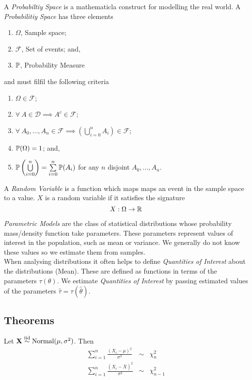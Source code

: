 \documentclass[11pt,a4paper]{article}
\begin{document}
A \textit{Probabiltiy Space} is a mathematicla construct for modelling the real world. A \textit{Probabilitiy Space} has three elements
\begin{enumerate}
	\item $\Omega$, Sample space;
	\item $\mathcal{F}$, Set of events; and,
	\item $\mathbb{P}$, Probability Measure
\end{enumerate}
and must filfil the following criteria
\begin{enumerate}
	\item $\Omega\in\mathcal{F}$;
	\item $\forall\ A\in\mathcal{D}\implies A^c\in\mathcal{F}$;
	\item $\forall\ A_0,\dots,A_n\in\mathcal{F}\implies\left(\bigcup\limits_{i=0}^nA_i\right)\in\mathcal{F}$;
	\item $\mathbb{P}(\Omega)=1$; and,
	\item $\mathbb{P}\left(\bigcup\limits_{i=0}^n\right)=\sum\limits_{i=0}^n\mathbb{P}(A_i)$ for any $n$ disjoint $A_0,\dots,A_n$.
\end{enumerate}

A \textit{Random Variable} is a function which maps maps an event in the sample space to a value. $X$ is a random variable if it satisfies the signature
$$X:\Omega\to\mathbb{R}$$

\textit{Parametric Models} are the class of statistical distributions whose probability mass/density function take parameters. These parameters represent values of interest in the population, such as mean or variance. We generally do not know these values so we estimate them from samples.\\

When analysing distributions it often helps to define \textit{Quantities of Interest} about the distributions (\eg Mean). These are defined as functions in terms of the parameters $\tau(\theta)$. We estimate \textit{Quantities of Interest} by passing estimated values of the parameters $\hat{\tau}=\tau(\hat{\theta})$.\\

\subsection{Theorems}

Let $\textbf{X}\overset{\text{iid}}{\sim}\text{Normal}(\mu,\sigma^2)$. Then
\[\begin{array}{rcl}
{\displaystyle\sum_{i=1}^n\frac{(X_i-\mu)^2}{\sigma^2}}&\sim&\chi^2_n\\
{\displaystyle\sum_{i=1}^n\frac{(X_i-\bar{X})^2}{\sigma^2}}&\sim&\chi^2_{n-1}\\
\end{array}\]
\end{document}
